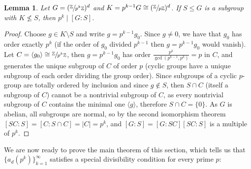 \documentclass{article}
\theoremstyle{plain}
\newtheorem{lemma}[theorem]{Lemma}
\theoremstyle{definition}
\theoremstyle{remark}
\newcommand{\Z}{\mathbb{Z}}
\newcommand{\quot}[2]{\sfrac{#1}{#2}}
\begin{document}
\begin{lemma}\label{lem:subgroup}
Let $G=(\quot{\Z}{p^k\Z})^d$ and $K=p^{k-1}G\cong(\quot{\Z}{p\Z})^d$. If $S\le G$ is a subgroup with $K\not\le S$, then $p^k\mid[G:S]$.
\end{lemma}
\begin{proof}
Choose $g\in K\setminus S$ and write $g=p^{k-1}g_0$. Since $g\ne0$, we have that $g_0$ has order exactly $p^k$ (if the order of $g_0$ divided $p^{k-1}$ then $g=p^{k-1}g_0$ would vanish). Let $C=\langle g_0\rangle\cong\quot{\Z}{p^k\Z}$, then $g=p^{k-1}g_0$ has order $\frac{p^k}{\gcd(p^{k-1},p^k)}=p$ in $C$, and generates the unique subgroup of $C$ of order $p$ (cyclic groups have a unique subgroup of each order dividing the group order). Since subgroups of a cyclic $p$-group are totally ordered by inclusion and  since $g\notin S$, then $S\cap C$ (itself a subgroup of $C$) cannot be a nontrivial subgroup of $C$, as every nontrivial subgroup of $C$ contains the minimal one $\langle g \rangle$, therefore $S\cap C=\{0\}$. As $G$ is abelian, all subgroups are normal, so by the second isomorphism theorem $[SC:S]=[C:S\cap C]=|C|=p^k$, and $[G:S]=[G:SC][SC:S]$ is a multiple of $p^k$.
\end{proof}

We are now ready to prove the main theorem of this section, which tells us that $\{a_d(p^k)\}_{k=1}^\infty$ satisfies a special divisibility condition for every prime $p$:
\end{document}
